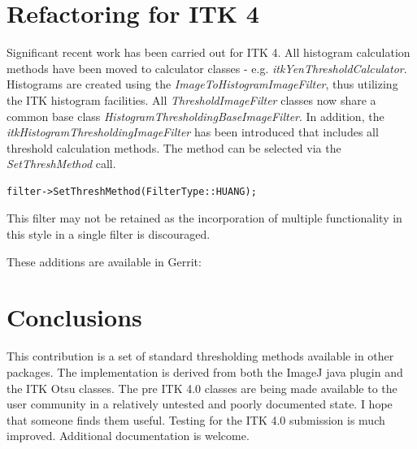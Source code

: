 \documentclass{InsightArticle}
\begin{document}
\section{Refactoring for ITK 4}
Significant recent work has been carried out for ITK 4. All histogram
calculation methods have been moved to calculator classes - e.g. {\em
  itkYenThresholdCalculator}. Histograms are created using the {\em
  ImageToHistogramImageFilter}, thus utilizing the ITK histogram
facilities. All {\em ThresholdImageFilter} classes now share a common
base class {\em HistogramThresholdingBaseImageFilter}. In addition,
the {\em itkHistogramThresholdingImageFilter} has been introduced that
includes all threshold calculation methods. The method can be selected
via the {\em SetThreshMethod} call.
\begin{verbatim}
filter->SetThreshMethod(FilterType::HUANG);
\end{verbatim}
This filter may not be retained as the incorporation of multiple
functionality in this style in a single filter is discouraged.

These additions are available in Gerrit:

\section{Conclusions}
This contribution is a set of standard thresholding methods available
in other packages. The implementation is derived from both the ImageJ
java plugin and the ITK Otsu classes. The pre ITK 4.0 classes are
being made available to the user community in a relatively untested
and poorly documented state.  I hope that someone finds them
useful. Testing for the ITK 4.0 submission is much
improved. Additional documentation is welcome.

\appendix





\nocite{ITKSoftwareGuide}
\end{document}
